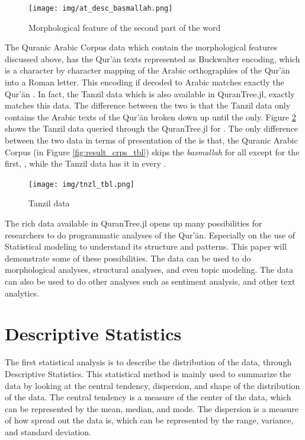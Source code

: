 \begin{figure}[!t]
    \centering
    \texttt{[image: img/at\_desc\_basmallah.png]}
    \caption{Morphological feature of the second part of the word }
    \label{fig:result_at_desc_basmallah}
\end{figure}

The Quranic Arabic Corpus data which contain the morphological features discussed above, has the Qur'\=an texts represented as Buckwalter encoding, which is a character by character mapping of the Arabic orthographies of the Qur'\=an into a Roman letter. This encoding if decoded to Arabic matches exactly the Qur'\=an  . In fact, the Tanzil data which is also available in QuranTree.jl, exactly matches this data. The difference between the two is that the Tanzil data only contains the Arabic texts of the Qur'\=an broken down up until the   only. Figure \ref{fig:result_tnzl_tbl} shows the Tanzil data queried through the QuranTree.jl for  . The only difference between the two data in terms of presentation of the   is that, the Quranic Arabic Corpus (in Figure \ref{fig:result_crps_tbl}) skips the \textit{basmallah} for all   except for the first,  , while the Tanzil data has it in every  .

\begin{figure}[!t]
    \centering
    \texttt{[image: img/tnzl\_tbl.png]}
    \caption{  Tanzil data}
    \label{fig:result_tnzl_tbl}
\end{figure}

The rich data available in QuranTree.jl opens up many possibilities for researchers to do programmatic analyses of the Qur'\=an. Especially on the use of Statistical modeling to understand its structure and patterns. This paper will demonstrate some of these possibilities. The data can be used to do morphological analyses, structural analyses, and even topic modeling. The data can also be used to do other analyses such as sentiment analysis, and other text analytics. 

\section{Descriptive Statistics}\label{sec:ch4_desc_stat}
The first statistical analysis is to describe the distribution of the data, through Descriptive Statistics. This statistical method is mainly used to summarize the data by looking at the central tendency, dispersion, and shape of the distribution of the data. The central tendency is a measure of the center of the data, which can be represented by the mean, median, and mode. The dispersion is a measure of how spread out the data is, which can be represented by the range, variance, and standard deviation.

